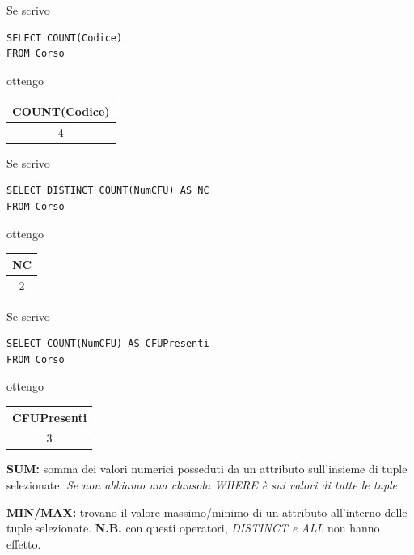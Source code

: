 \documentclass{article}
\begin{document}
Se scrivo \hfill\begin{minipage}{0.33\textwidth}
\begin{lstlisting}[style=sqlstyle]
SELECT COUNT(Codice)
FROM Corso 
\end{lstlisting}
\end{minipage}\hfill
ottengo\hfill
\begin{minipage}{0.33\textwidth}
\begin{tabular}{|c|}
	\hline
	\textbf{COUNT(Codice)} \\
	\hline
	4\\
	\hline
\end{tabular} 

\end{minipage}

Se scrivo \hfill
\begin{minipage}{0.33\textwidth}
\begin{lstlisting}[style=sqlstyle]
SELECT DISTINCT COUNT(NumCFU) AS NC
FROM Corso 
\end{lstlisting}
\end{minipage}
\hfill
ottengo
\hfill
\begin{minipage}{0.33\textwidth}
\begin{tabular}{|c|}
	\hline
	\textbf{NC}\\
	\hline
	2\\
	\hline
\end{tabular} 
\end{minipage}


Se scrivo \hfill \begin{minipage}{0.33\textwidth}
\begin{lstlisting}[style=sqlstyle]
SELECT COUNT(NumCFU) AS CFUPresenti
FROM Corso 
\end{lstlisting}
\end{minipage}
\hfill ottengo \hfill
\begin{minipage}{0.33\textwidth}
	\begin{tabular}{|c|}
		\hline
		\textbf{CFUPresenti} \\
		\hline
		3\\
		\hline
	\end{tabular} 
\end{minipage}

\textbf{SUM:} somma dei valori numerici posseduti da un attributo sull'insieme di tuple selezionate. \textit{Se non abbiamo una clausola WHERE è sui valori di  tutte le tuple.}

\textbf{MIN/MAX:} trovano il valore massimo/minimo di un attributo all'interno delle tuple selezionate. \textbf{N.B.} con questi operatori, \textit{DISTINCT e ALL} non hanno effetto.
\end{document}
